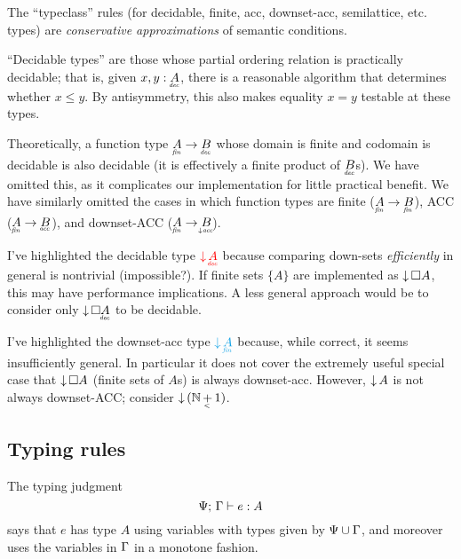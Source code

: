 \documentclass{article}
\begin{document}

The ``typeclass'' rules (for decidable, finite, acc, downset-acc, semilattice,
etc.\! types) are \emph{conservative approximations} of semantic conditions.

``Decidable types'' are those whose partial ordering relation is practically
decidable; that is, given $x, y : \eq{A}$, there is a reasonable algorithm that
determines whether $x \le y$. By antisymmetry, this also makes equality $x = y$
testable at these types.

Theoretically, a function type $\under{fin}{A} \to \eq{B}$ whose domain is
finite and codomain is decidable is also decidable (it is effectively a finite
product of $\eq{B}$s). We have omitted this, as it complicates our
implementation for little practical benefit. We have similarly omitted the cases
in which function types are finite ($\fin{A} \to \fin{B}$), ACC ($\fin{A} \to
\acc{B}$), and downset-ACC ($\fin{A} \to \eltacc{B}$).

I've highlighted the decidable type ${\color{red} \Down{\eq{A}}}$ because
comparing down-sets \emph{efficiently} in general is nontrivial (impossible?).
If finite sets $\{A\}$ are implemented as ${\downarrow}\,{\square{A}}$, this may have
performance implications. A less general approach would be to consider only
$\Down{\Disc{\eq{A}}}$ to be decidable.

I've highlighted the downset-acc type ${\color{Cerulean} \Down{\fin{A}}}$
because, while correct, it seems insufficiently general. In particular it does
not cover the extremely useful special case that ${\downarrow}\,{\square{A}}$ (finite sets
of $A$s) is always downset-acc. However, ${\downarrow}\,{A}$ is not always downset-ACC;
consider $\Down{(\N \mathop{\under{<}{{+}}} 1)}$. 


\subsection{Typing rules}

The typing judgment \[{\Psi};\,{\Gamma}\vdash {e}:{A}\] says that $e$ has type $A$ using
variables with types given by $\Psi \cup \Gamma$, and moreover uses the variables in
$\Gamma$ in a monotone fashion.
\end{document}
